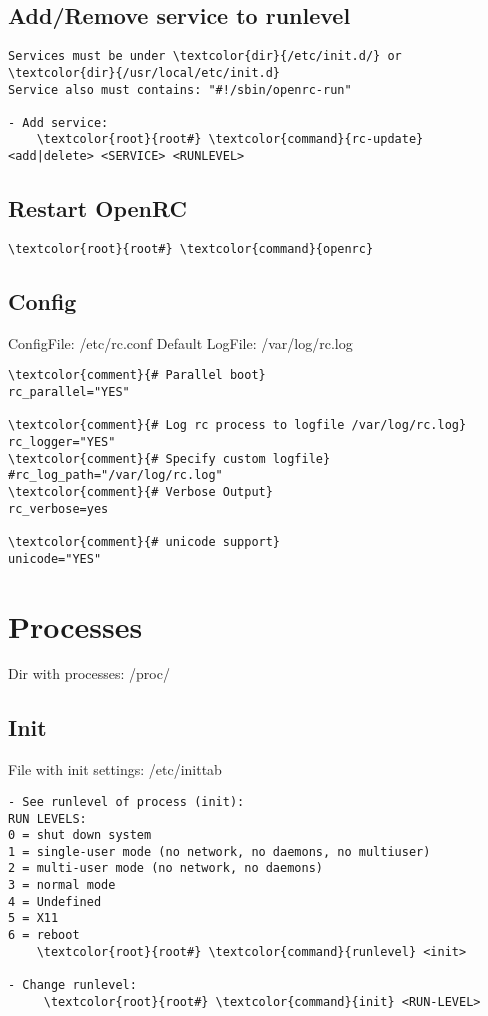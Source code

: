 \documentclass[10pt, a4paper, onecolumn, openany]{book}         %
\begin{document}
\subsection{Add/Remove service to runlevel}
\begin{Verbatim}[commandchars=\\\{\}]
Services must be under \textcolor{dir}{/etc/init.d/} or \textcolor{dir}{/usr/local/etc/init.d}
Service also must contains: "#!/sbin/openrc-run"

- Add service:
    \textcolor{root}{root#} \textcolor{command}{rc-update} <add|delete> <SERVICE> <RUNLEVEL>
\end{Verbatim}

\subsection{Restart OpenRC}
\begin{Verbatim}[commandchars=\\\{\}]
    \textcolor{root}{root#} \textcolor{command}{openrc}
\end{Verbatim}

\subsection{Config}
ConfigFile: \textcolor{file}{/etc/rc.conf}\newline
Default LogFile: \textcolor{file}{/var/log/rc.log}
\begin{Verbatim}[commandchars=\\\{\}]
\textcolor{comment}{# Parallel boot}
rc_parallel="YES"

\textcolor{comment}{# Log rc process to logfile /var/log/rc.log}
rc_logger="YES"
\textcolor{comment}{# Specify custom logfile}
#rc_log_path="/var/log/rc.log"
\textcolor{comment}{# Verbose Output}
rc_verbose=yes

\textcolor{comment}{# unicode support}
unicode="YES"
\end{Verbatim}



\section{Processes}
Dir with processes: \textcolor{dir}{/proc/}

\subsection{Init}
File with init settings: \textcolor{file}{/etc/inittab}
\begin{Verbatim}[commandchars=\\\{\}]
- See runlevel of process (init):
RUN LEVELS:
0 = shut down system
1 = single-user mode (no network, no daemons, no multiuser)
2 = multi-user mode (no network, no daemons)
3 = normal mode
4 = Undefined
5 = X11
6 = reboot
    \textcolor{root}{root#} \textcolor{command}{runlevel} <init>

- Change runlevel:
     \textcolor{root}{root#} \textcolor{command}{init} <RUN-LEVEL>
\end{Verbatim}
\end{document}
